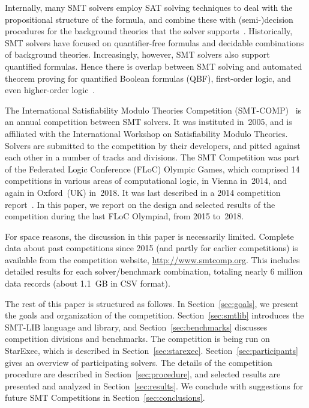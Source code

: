 \documentclass[twoside,11pt]{article}
\begin{document}
Internally, many SMT solvers employ SAT solving techniques to deal
with the propositional structure of the formula, and combine these
with (semi-)decision procedures for the background theories that the
solver
supports~\cite{DBLP:conf/cav/BarrettCDHJKRT11,DBLP:conf/cade/BoutonODF09,DBLP:conf/tacas/MouraB08}.
Historically, SMT solvers have focused on quantifier-free formulas and
decidable combinations of background theories.  Increasingly, however,
SMT solvers also support quantified formulas.  Hence there is overlap
between SMT solving and automated theorem proving for quantified
Boolean formulas (QBF), first-order logic, and even higher-order
logic~\cite{DBLP:journals/corr/abs-1712-01486}.

The International Satisfiability Modulo Theories Competition
(SMT-COMP)~\cite{BdMS05,BdMS07,BDdMOS13,BDOS08,BDOS10,CDW14,CGBD12} is
an annual competition between SMT solvers.  It was instituted in~2005,
and is affiliated with the International Workshop on Satisfiability
Modulo Theories.  Solvers are submitted to the competition by their
developers, and pitted against each other in a number of tracks and
divisions.  The SMT Competition was part of the Federated Logic
Conference (FLoC) Olympic Games, which comprised 14 competitions in
various areas of computational logic, in Vienna in~2014, and again in
Oxford~(UK) in~2018.  It was last described in a 2014 competition
report~\cite{CDW14}.  In this paper, we report on the design and
selected results of the competition during the last FLoC Olympiad,
from 2015 to~2018.

For space reasons, the discussion in this paper is necessarily
limited.  Complete data about past competitions since 2015 (and partly
for earlier competitions) is available from the competition website,
\url{http://www.smtcomp.org}.  This includes detailed results for each
solver/benchmark combination, totaling nearly 6 million data records
(about 1.1~GB in CSV format).

The rest of this paper is structured as follows.  In
Section~\ref{sec:goals}, we present the goals and organization of the
competition.  Section~\ref{sec:smtlib} introduces the SMT-LIB language
and library, and Section~\ref{sec:benchmarks} discusses competition
divisions and benchmarks.  The competition is being run on StarExec,
which is described in Section~\ref{sec:starexec}.
Section~\ref{sec:participants} gives an overview of participating
solvers.  The details of the competition procedure are described in
Section~\ref{sec:procedure}, and selected results are presented and
analyzed in Section~\ref{sec:results}.  We conclude with suggestions
for future SMT Competitions in Section~\ref{sec:conclusions}.
\end{document}
